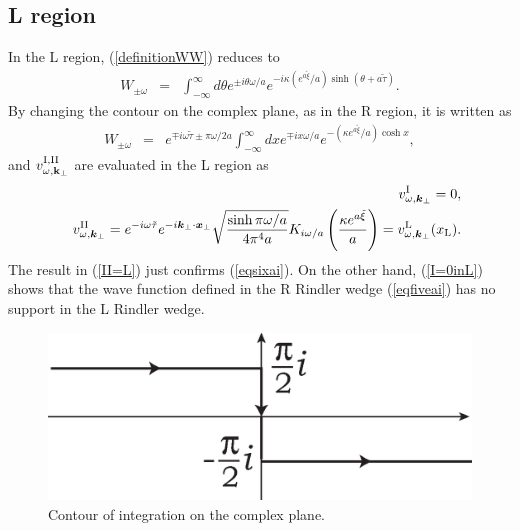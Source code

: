 \documentclass[aps,prd,preprintnumbers,nofootinbib,showpacs,11pt]{revtex4}%
\begin{document}
\begin{widetext}
\subsection{L region}
In the L region, (\ref{definitionWW}) reduces to 
\begin{eqnarray}
W_{\pm \omega}&=&\int_{-\infty}^{\infty} {d\theta }e^{\pm i\theta\omega/a} e^{-i\kappa (e^{a\tilde\xi}/a)\sinh (\theta+a\tilde\tau) }.
\label{definitionWL}
\end{eqnarray}
By changing the contour on the complex plane, as in the R region,
it is written as
\begin{eqnarray}
W_{\pm \omega}&=&e^{\mp i\omega\tilde\tau\pm \pi\omega/2a}\int_{-\infty}^{\infty} {dx }e^{\mp ix\omega/a} 
e^{-(\kappa e^{a\tilde\xi}/a)\cosh x},
\label{definitionWR2}
\end{eqnarray}
and $v^{\rm I, II}_{\omega, {\bf k}_\perp}$ are evaluated in the L region as
\begin{eqnarray}
&&v^{\I}_{\omega,\bm k_\perp}=0,
\label{I=0inL}
\\
&&v^{\II}_{\omega,\bm k_\perp}=e^{-i\omega\tilde\tau} e^{-i\bm k_\perp\cdot \bm x_\perp}\sqrt{\sinh \pi\omega/a \over 4\pi^4 a}
K_{i\omega/a}\left({\kappa e^{a\tilde \xi} \over a}\right)
=v^{\L}_{\omega,\bm k_\perp}(x_{\rm L}).
\label{II=L}
\end{eqnarray}
The result in (\ref{II=L}) just confirms (\ref{eqsixai}).
On the other hand, (\ref{I=0inL}) shows that the wave function defined in the R 
Rindler wedge (\ref{eqfiveai}) has no support in the L Rindler wedge.
\begin{figure}[b]
\begin{center}
    \includegraphics[width=6.cm]{fig2.eps}
\caption{Contour of integration on the complex plane.
\label{CPcont}}
\end{center}
\end{figure}

\end{widetext}
\end{document}
